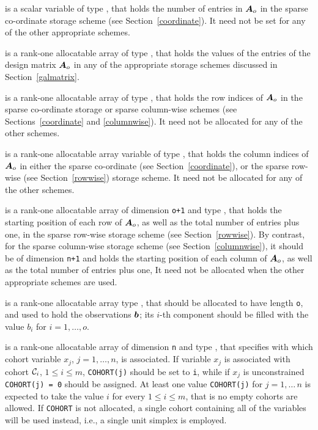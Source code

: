 \documentclass{galahad}
\begin{document}
\begin{description}
\begin{description}
 is a scalar variable of type \integer, that
holds the number of entries in ${\bm{A}}_o$
in the sparse co-ordinate storage scheme (see Section~\ref{coordinate}).
It need not be set for any of the other appropriate schemes.

 is a rank-one allocatable array of type \realdp, that
holds the values of the entries of the design matrix ${\bm{A}}_o$ in any of the
appropriate storage schemes discussed in Section~\ref{galmatrix}.

 is a rank-one allocatable array of type \integer,
that holds the row indices of ${\bm{A}}_o$ in the sparse co-ordinate storage
or sparse column-wise schemes
(see Sections~\ref{coordinate} and \ref{columnwise}).
It need not be allocated for any of the other schemes.

 is a rank-one allocatable array variable of type \integer,
that holds the column indices of ${\bm{A}}_o$ in either the sparse co-ordinate
(see Section~\ref{coordinate}), or the sparse row-wise
(see Section~\ref{rowwise}) storage scheme.
It need not be allocated for any of the other schemes.

 is a rank-one allocatable array of dimension {\tt o+1} and type
\integer, that holds the starting position of each row of ${\bm{A}}_o$,
as well as the total number of entries plus one,
in the sparse row-wise storage scheme (see Section~\ref{rowwise}).
By contrast, for the sparse column-wise storage scheme
(see Section~\ref{columnwise}), it should be of dimension {\tt n+1}
and holds the starting position of each column of ${\bm{A}}_o$,
as well as the total number of entries plus one,
It need not be allocated when the other appropriate schemes are used.

\end{description}

 is a rank-one allocatable array type \realdp, that
should be allocated to have length {\tt o}, and used to hold
the observations ${\bm{b}}$; its $i$-th component should be
filled with the value $b_{i}$ for $i = 1, \ldots , o$.

 is a rank-one allocatable array of dimension {\tt n} and type
\integer, that specifies with which cohort variable $x_j$, $j = 1,\ldots,n$, 
is associated. If variable $x_j$ is associated with cohort $\calC_i$, 
$1 \leq i \leq m$, {\tt COHORT(j)} should be set to {\tt i}, while if $x_j$ 
is unconstrained {\tt COHORT(j) = 0} should be assigned. At least one value 
{\tt COHORT(j)} for $j = 1,\ldots\,n$ is expected to take the value $i$ 
for every $1 \leq i \leq m$, that is no empty cohorts are allowed.
If {\tt COHORT} is not allocated, a single cohort containing all of
the variables will be used instead, i.e., a single unit simplex is employed.


\end{description}
\end{document}
